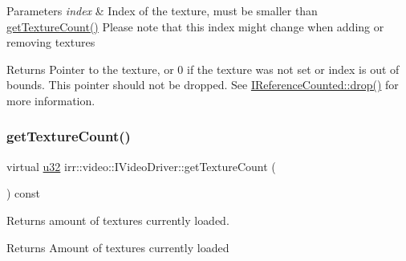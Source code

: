 \begin{DoxyParams}{Parameters}
{\em index} & Index of the texture, must be smaller than \hyperlink{classirr_1_1video_1_1IVideoDriver_a4c3f976980dd8387db37feca8c8e2d73}{get\+Texture\+Count()} Please note that this index might change when adding or removing textures \\
\hline
\end{DoxyParams}
\begin{DoxyReturn}{Returns}
Pointer to the texture, or 0 if the texture was not set or index is out of bounds. This pointer should not be dropped. See \hyperlink{classirr_1_1IReferenceCounted_a03856a09355b89d178090c4a5f738543}{I\+Reference\+Counted\+::drop()} for more information. 
\end{DoxyReturn}
\mbox{\label{classirr_1_1video_1_1IVideoDriver_a4c3f976980dd8387db37feca8c8e2d73}} 
\subsubsection{\texorpdfstring{get\+Texture\+Count()}{getTextureCount()}}
{\footnotesize\ttfamily virtual \hyperlink{namespaceirr_a0416a53257075833e7002efd0a18e804}{u32} irr\+::video\+::\+I\+Video\+Driver\+::get\+Texture\+Count (\begin{DoxyParamCaption}{ }\end{DoxyParamCaption}) const\hspace{0.3cm}{\ttfamily [pure virtual]}}



Returns amount of textures currently loaded. 

\begin{DoxyReturn}{Returns}
Amount of textures currently loaded 
\end{DoxyReturn}
\mbox{\label{classirr_1_1video_1_1IVideoDriver_ae64d474cbca38f64f2dbb8fcacb1a035}} 
